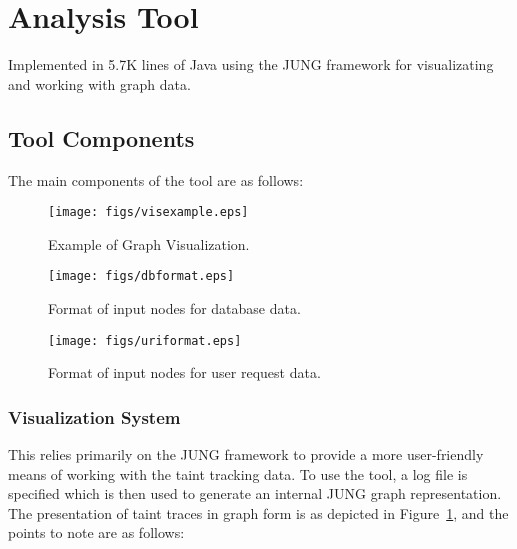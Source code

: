 \documentclass[msc,oneside]{ubcthesis}
\begin{document}



\section{Analysis Tool}
Implemented in 5.7K lines of Java using the JUNG framework for visualizating and working with graph data.

\subsection{Tool Components}
The main components of the tool are as follows:

\begin{figure}[ht]
  \begin{center}
    \texttt{[image: figs/visexample.eps]}
    \caption[Example of Graph Visualization.]{\label{fig:visexample} Example of Graph Visualization.}
  \end{center}
\end{figure}

\begin{figure}[ht]
  \begin{center}
    \texttt{[image: figs/dbformat.eps]}
    \caption[Format of input nodes for database data.]{\label{fig:dbformat} Format of input nodes for database data.}
  \end{center}
\end{figure}

\begin{figure}[ht]
  \begin{center}
    \texttt{[image: figs/uriformat.eps]}
    \caption[Format of input nodes for user request data.]{\label{fig:uriformat} Format of input nodes for user request data.}
  \end{center}
\end{figure}

\subsubsection{Visualization System} 
\label{subsub:vissystem}
This relies primarily on the JUNG framework to provide a more user-friendly means of working with the taint tracking data. To use the tool, a log file is specified which is then used to generate an internal JUNG graph representation. The presentation of taint traces in graph form is as depicted in Figure~\ref{fig:visexample}, and the points to note are as follows:
\end{document}
